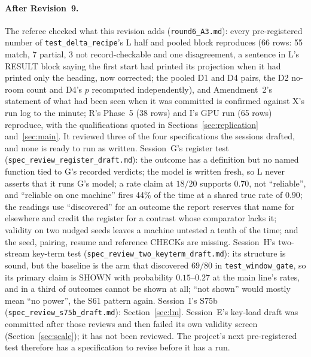 \documentclass[11pt]{article}
\begin{document}
\paragraph{After Revision~9.} The referee checked what this revision adds (\texttt{round6\_A3.md}): every pre-registered number of \texttt{test\_delta\_recipe}'s L half and pooled block reproduces (66 rows: 55 match, 7 partial, 3 not record-checkable and one disagreement, a sentence in L's RESULT block saying the first start had printed its projection when it had printed only the heading, now corrected; the pooled D1 and D4 pairs, the D2 no-room count and D4's $p$ recomputed independently), and Amendment~2's statement of what had been seen when it was committed is confirmed against X's run log to the minute; R's Phase~5 (38 rows) and I's GPU run (65 rows) reproduce, with the qualifications quoted in Sections~\ref{sec:replication} and~\ref{sec:main}. It reviewed three of the four specifications the sessions drafted, and none is ready to run as written. Session~G's register test (\texttt{spec\_review\_register\_draft.md}): the outcome has a definition but no named function tied to G's recorded verdicts; the model is written fresh, so L never asserts that it runs G's model; a rate claim at $18/20$ supports $0.70$, not ``reliable'', and ``reliable on one machine'' fires 44\% of the time at a shared true rate of $0.90$; the readings use ``discovered'' for an outcome the report reserves that name for elsewhere and credit the register for a contrast whose comparator lacks it; validity on two nudged seeds leaves a machine untested a tenth of the time; and the seed, pairing, resume and reference CHECKs are missing. Session~H's two-stream key-term test (\texttt{spec\_review\_two\_keyterm\_draft.md}): its structure is sound, but the baseline is the arm that discovered $69/80$ in \texttt{test\_window\_gate}, so its primary claim is SHOWN with probability $0.15$--$0.27$ at the main line's rates, and in a third of outcomes cannot be shown at all; ``not shown'' would mostly mean ``no power'', the S61 pattern again. Session~I's S75b (\texttt{spec\_review\_s75b\_draft.md}): Section~\ref{sec:lm}. Session~E's key-load draft was committed after those reviews and then failed its own validity screen (Section~\ref{sec:scale}); it has not been reviewed. The project's next pre-registered test therefore has a specification to revise before it has a run.
\end{document}
